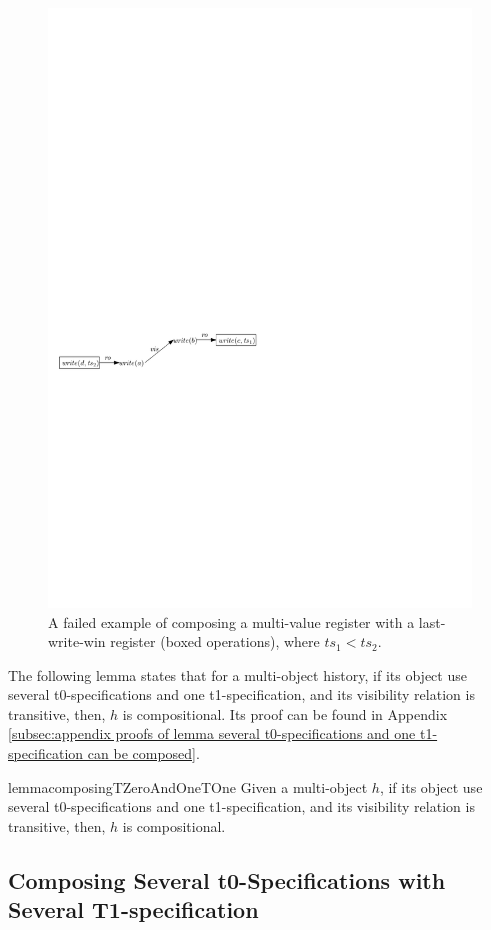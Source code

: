 \begin{figure}[t]
  \centering
  \includegraphics[width=0.6 \textwidth]{figures/MVReg-LWWReg-Nocd.pdf}
\vspace{-10pt}
  \caption{A failed example of composing a multi-value register with a last-write-win register (boxed operations), where $\mathit{ts}_1 < \mathit{ts}_2$.}
  \label{fig:a failed example of composing a multi-value register with a last-write-win register}
\end{figure}

The following lemma states that for a multi-object history, if its object use several t0-specifications and one t1-specification, and its visibility relation is transitive, then, $h$ is compositional. Its proof can be found in Appendix \ref{subsec:appendix proofs of lemma several t0-specifications and one t1-specification can be composed}.

\begin{restatable}{lemma}{composingTZeroAndOneTOne}
\label{lemma:several t0-specifications and one t1-specification can be composed}
Given a multi-object $h$, if its object use several t0-specifications and one t1-specification, and its visibility relation is transitive, then, $h$ is compositional.
\end{restatable}




\subsection{Composing Several t0-Specifications with Several T1-specification}
\label{lemma:composing several t0-specification with several t1-specification}

